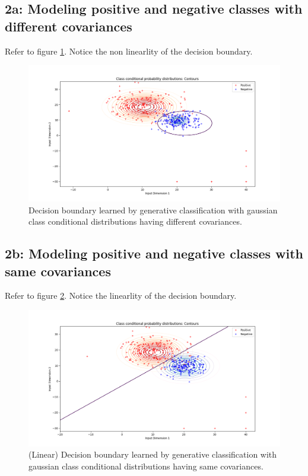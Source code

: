 \documentclass[a4paper,11pt]{article}
\begin{document}
\begin{mlsolution}
\subsection{2a: Modeling positive and negative classes with different covariances}
Refer to figure \ref{gc2a}. Notice the non linearlity of the decision boundary.
\begin{figure}[!htb]
	\centering
	\includegraphics[scale=0.4]{generative_binclassv2.png}
	\caption{Decision boundary learned by generative classification with gaussian class conditional distributions having different covariances.}
	\label{gc2a}
\end{figure}

\subsection{2b: Modeling positive and negative classes with same covariances}
Refer to figure \ref{gc2b}. Notice the linearlity of the decision boundary.
\begin{figure}[!htb]
	\centering
	\includegraphics[scale=0.4]{generative_same_covariance_binclassv2.png}
	\caption{(Linear) Decision boundary learned by generative classification with gaussian class conditional distributions having same covariances.}
	\label{gc2b}
\end{figure}



\end{mlsolution}
\end{document}
